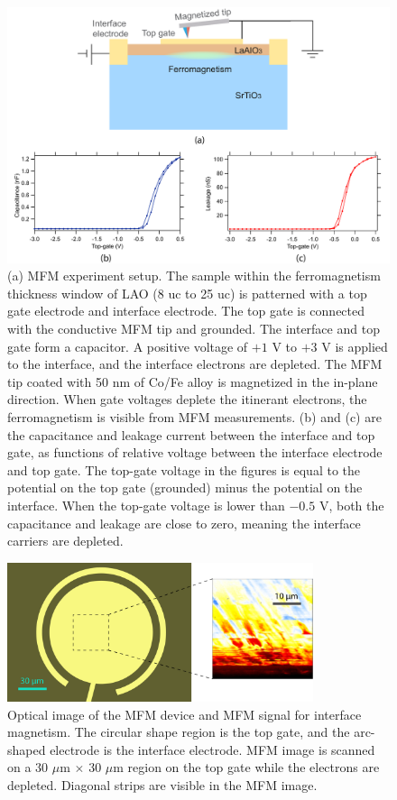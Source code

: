 \documentclass[pdflatex, sectionletters, 12pt]{pittetd}    %
\begin{document}
\begin{figure}[p]
	\centering
	\includegraphics[width=1.0\textwidth]{Drawing/LAOSTOMFM.pdf}
	\caption{(a) MFM experiment setup. The sample within the ferromagnetism thickness window of LAO (8 uc to 25 uc) is patterned with a top gate electrode and interface electrode. The top gate is connected with the conductive MFM tip and grounded. The interface and top gate form a capacitor. A positive voltage of $+1$ V to $+3$ V is applied to the interface, and the interface electrons are depleted. The MFM tip coated with 50 nm of Co/Fe alloy is magnetized in the in-plane direction. When gate voltages deplete the itinerant electrons, the ferromagnetism is visible from MFM measurements. (b) and (c) are the capacitance and leakage current between the interface and top gate, as functions of relative voltage between the interface electrode and top gate. The top-gate voltage in the figures is equal to the potential on the top gate (grounded) minus the potential on the interface. When the top-gate voltage is lower than $-0.5$ V, both the capacitance and leakage are close to zero, meaning the interface carriers are depleted.}
	\label{FIG:LAOSTOMFM}
\end{figure}

\begin{figure}[h!]
	\centering
	\includegraphics[width=0.8\textwidth]{Drawing/MFMSignal.pdf}
	\caption{Optical image of the MFM device and MFM signal for interface magnetism. The circular shape region is the top gate, and the arc-shaped electrode is the interface electrode. MFM image is scanned on a 30 $\mu$m $
		\times$ 30 $\mu$m region on the top gate while the electrons are depleted. Diagonal strips are visible in the MFM image.}
	\label{FIG:MFMSignal}
\end{figure}
\end{document}
